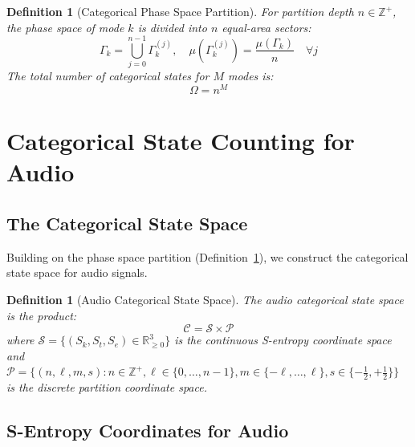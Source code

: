 \documentclass[twocolumn,10pt]{article}
\newtheorem{definition}[theorem]{Definition}
\theoremstyle{remark}
\newcommand{\Sk}{S_k}
\newcommand{\St}{S_t}
\newcommand{\Se}{S_e}
\newcommand{\calC}{\mathcal{C}}
\newcommand{\calS}{\mathcal{S}}
\newcommand{\calP}{\mathcal{P}}
\begin{document}
\begin{definition}[Categorical Phase Space Partition]
\label{def:categorical_partition}
For partition depth $n \in \mathbb{Z}^+$, the phase space of mode $k$ is divided into $n$ equal-area sectors:
\begin{equation}
    \Gamma_k = \bigcup_{j=0}^{n-1} \Gamma_k^{(j)}, \quad \mu(\Gamma_k^{(j)}) = \frac{\mu(\Gamma_k)}{n} \quad \forall j
    \label{eq:phase_partition}
\end{equation}
The total number of categorical states for $M$ modes is:
\begin{equation}
    \Omega = n^M
    \label{eq:total_states}
\end{equation}
\end{definition}


\section{Categorical State Counting for Audio}
\label{sec:categorical_audio}

\subsection{The Categorical State Space}

Building on the phase space partition (Definition~\ref{def:categorical_partition}), we construct the categorical state space for audio signals.

\begin{definition}[Audio Categorical State Space]
\label{def:audio_categorical}
The audio categorical state space is the product:
\begin{equation}
    \calC = \calS \times \calP
\end{equation}
where $\calS = \{(\Sk, \St, \Se) \in \mathbb{R}_{\geq 0}^3\}$ is the continuous S-entropy coordinate space and $\calP = \{(n, \ell, m, s) : n \in \mathbb{Z}^+, \ell \in \{0, \ldots, n-1\}, m \in \{-\ell, \ldots, \ell\}, s \in \{-\tfrac{1}{2}, +\tfrac{1}{2}\}\}$ is the discrete partition coordinate space.
\end{definition}

\subsection{S-Entropy Coordinates for Audio}
\end{document}
